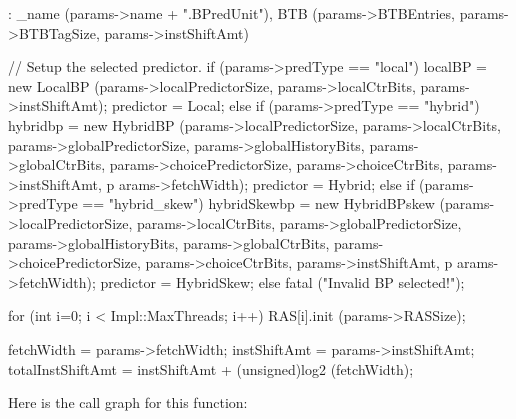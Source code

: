 \begin{DoxyCode}
    : _name (params->name + ".BPredUnit"),
      BTB (params->BTBEntries,
          params->BTBTagSize,
          params->instShiftAmt)
{
    // Setup the selected predictor.
    if (params->predType == "local") {
        localBP = new LocalBP (params->localPredictorSize,
                              params->localCtrBits,
                              params->instShiftAmt);
        predictor = Local;
    } else if (params->predType == "hybrid") {
        hybridbp = new HybridBP (params->localPredictorSize,
                                        params->localCtrBits,
                                        params->globalPredictorSize,
                                        params->globalHistoryBits,
                                        params->globalCtrBits,
                                        params->choicePredictorSize,
                                        params->choiceCtrBits,
                                        params->instShiftAmt,
                                                                                p
      arams->fetchWidth);
        predictor = Hybrid;
    } else if (params->predType == "hybrid_skew") {
        hybridSkewbp = new HybridBPskew (params->localPredictorSize,
                                        params->localCtrBits,
                                        params->globalPredictorSize,
                                        params->globalHistoryBits,
                                        params->globalCtrBits,
                                        params->choicePredictorSize,
                                        params->choiceCtrBits,
                                        params->instShiftAmt,
                                                                                p
      arams->fetchWidth);
        predictor = HybridSkew;
    } else {
        fatal ("Invalid BP selected!");
    }

    for (int i=0; i < Impl::MaxThreads; i++)
        RAS[i].init (params->RASSize);
        
        fetchWidth = params->fetchWidth;
        instShiftAmt = params->instShiftAmt;
        totalInstShiftAmt = instShiftAmt + (unsigned)log2 (fetchWidth);
}
\end{DoxyCode}


Here is the call graph for this function:




